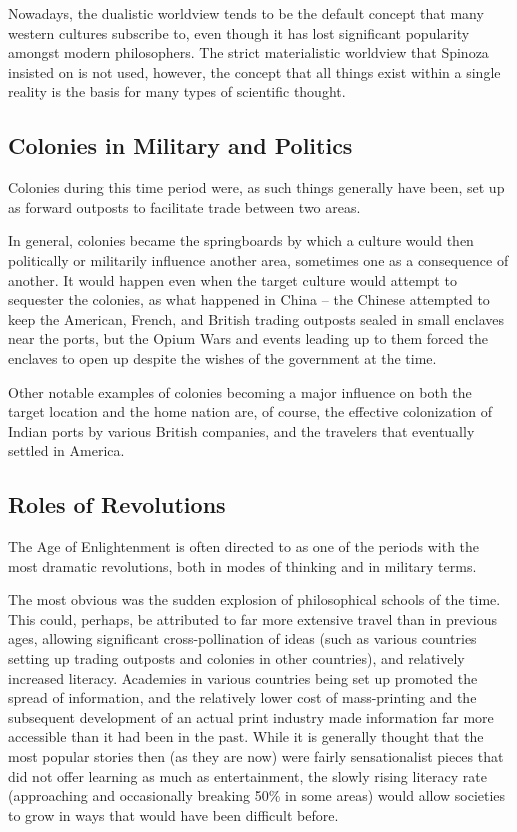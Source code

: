 \documentclass{article}
\begin{document}
Nowadays, the dualistic worldview tends to be the default concept that many western cultures subscribe to, even though it has lost significant popularity amongst modern philosophers. The strict materialistic worldview that Spinoza insisted on is not used, however, the concept that all things exist within a single reality is the basis for many types of scientific thought.

\subsection{Colonies in Military and Politics}

Colonies during this time period were, as such things generally have been, set up as forward outposts to facilitate trade between two areas.

In general, colonies became the springboards by which a culture would then politically or militarily influence another area, sometimes one as a consequence of another.
It would happen even when the target culture would attempt to sequester the colonies, as what happened in China -- the Chinese attempted to keep the American, French, and British trading outposts sealed in small enclaves near the ports, but the Opium Wars and events leading up to them forced the enclaves to open up despite the wishes of the government at the time.

Other notable examples of colonies becoming a major influence on both the target location and the home nation are, of course, the effective colonization of Indian ports by various British companies, and the travelers that eventually settled in America.

\subsection{Roles of Revolutions}

The Age of Enlightenment is often directed to as one of the periods with the most dramatic revolutions, both in modes of thinking and in military terms.

The most obvious was the sudden explosion of philosophical schools of the time.
This could, perhaps, be attributed to far more extensive travel than in previous ages, allowing significant cross-pollination of ideas (such as various countries setting up trading outposts and colonies in other countries), and relatively increased literacy.
Academies in various countries being set up promoted the spread of information, and the relatively lower cost of mass-printing and the subsequent development of an actual print industry made information far more accessible than it had been in the past.
While it is generally thought that the most popular stories then (as they are now) were fairly sensationalist pieces that did not offer learning as much as entertainment, the slowly rising literacy rate (approaching and occasionally breaking 50\% in some areas) would allow societies to grow in ways that would have been difficult before.
\end{document}
